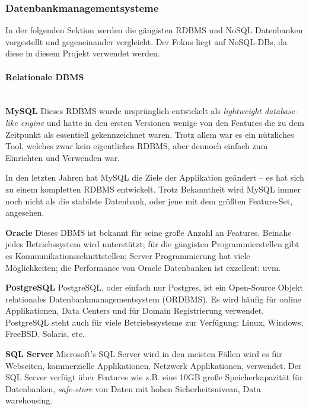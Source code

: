 \subsubsection{Datenbankmanagementsysteme}
\label{subsec:dbms}

In der folgenden Sektion werden die gängisten RDBMS und NoSQL Datenbanken vorgestellt und gegeneinander vergleicht. Der Fokus liegt auf NoSQL-DBs, da diese in diesem Projekt verwendet werden.

\paragraph{Relationale DBMS}\mbox{}\\
\textbf{MySQL\newline}
Dieses RDBMS wurde ursprünglich entwickelt als \textit{lightweight database-like engine} und hatte in den ersten Versionen wenige von den Features die zu dem Zeitpunkt als essentiell gekennzeichnet waren. Trotz allem war es ein nützliches Tool, welches zwar kein eigentliches RDBMS, aber dennoch einfach zum Einrichten und Verwenden war.

In den letzten Jahren hat MySQL die Ziele der Applikation geändert – es hat sich zu einem kompletten RDBMS entwickelt.  Trotz Bekanntheit wird MySQL immer noch nicht als die stabilste Datenbank, oder jene mit dem größten Feature-Set, angesehen.

\textbf{Oracle\newline}
Dieses DBMS ist bekannt für seine große Anzahl an Features. Beinahe jedes Betriebssystem wird unterstützt; für die gängisten Programmierstellen gibt es Kommunikationsschnittstellen; Server Programmierung hat viele Möglichkeiten; die Performance von Oracle Datenbanken ist exzellent; uvm.

\textbf{PostgreSQL\newline}
PostgreSQL, oder einfach nur Postgres, ist ein Open-Source Objekt relationales Datenbankmanagementsystem (ORDBMS). Es wird häufig für online Applikationen, Data Centers und für Domain Registrierung verwendet. PostgreSQL steht auch für viele Betriebssysteme zur Verfügung: Linux, Windows, FreeBSD, Solaris, etc.

\textbf{SQL Server\newline}
Microsoft's SQL Server wird in den meisten Fällen wird es für Webseiten, kommerzielle Applikationen, Netzwerk Applikationen, verwendet. Der SQL Server verfügt über Features wie z.B. eine 10GB große Speicherkapazität für Datenbanken, \textit{safe-store} von Daten mit hohen Sicherheitsniveau, Data warehousing. 

